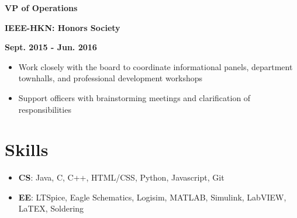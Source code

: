 \documentclass[12pt]{article}
\newcommand\textbox[1]{\parbox{.333\textwidth}{#1}}
\newcommand{\textlcr}[3]{\textbox{\textbf{#1}\hfill}\textbox{\hfil \textbf{#2}\hfil}\textbox{\hfill \textbf{#3}}}
\begin{document}
\textlcr{VP of Operations}{IEEE-HKN: Honors Society}{Sept. 2015 - Jun. 2016}
\begin{itemize}
\item Work closely with the board to coordinate informational panels, department townhalls, and professional development workshops
\item Support officers with brainstorming meetings and clarification of responsibilities
\end{itemize}

\section*{Skills}
\vspace*{-1em}\makebox[\linewidth]{\rule{\textwidth}{0.4pt}}
\begin{itemize}
\item \textbf{CS}: Java, C, C++, HTML/CSS, Python, Javascript, Git
\item \textbf{EE}: LTSpice, Eagle Schematics, Logisim, MATLAB, Simulink, LabVIEW, LaTEX, Soldering
\end{itemize}
\end{document}
